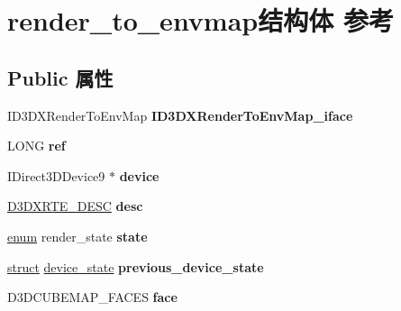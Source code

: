 \hypertarget{structrender__to__envmap}{}\section{render\+\_\+to\+\_\+envmap结构体 参考}
\label{structrender__to__envmap}
\subsection*{Public 属性}
\begin{DoxyCompactItemize}
\item 
\mbox{\label{structrender__to__envmap_adb946b3704111c374a41ec09aa863e51}} 
I\+D3\+D\+X\+Render\+To\+Env\+Map {\bfseries I\+D3\+D\+X\+Render\+To\+Env\+Map\+\_\+iface}
\item 
\mbox{\label{structrender__to__envmap_a16d9df6215a23ee7cfeef3804cf83f51}} 
L\+O\+NG {\bfseries ref}
\item 
\mbox{\label{structrender__to__envmap_a9f87ad2f8f277e0a9e319f4c0edafddf}} 
I\+Direct3\+D\+Device9 $\ast$ {\bfseries device}
\item 
\mbox{\label{structrender__to__envmap_aac93d6df41a5bb0b1b993d20ac7cc25e}} 
\hyperlink{struct___d3_d_x_r_t_e___d_e_s_c}{D3\+D\+X\+R\+T\+E\+\_\+\+D\+E\+SC} {\bfseries desc}
\item 
\mbox{\label{structrender__to__envmap_a7c32ff5096e3f8248fe1bcb3d2c52666}} 
\hyperlink{interfaceenum}{enum} render\+\_\+state {\bfseries state}
\item 
\mbox{\label{structrender__to__envmap_acb0bbeb56de93c3775a23d786f5df1fa}} 
\hyperlink{interfacestruct}{struct} \hyperlink{structdevice__state}{device\+\_\+state} {\bfseries previous\+\_\+device\+\_\+state}
\item 
\mbox{\label{structrender__to__envmap_a623b4c303a1f0105e2cf15a5fb884a61}} 
D3\+D\+C\+U\+B\+E\+M\+A\+P\+\_\+\+F\+A\+C\+ES {\bfseries face}
\item 
\mbox{\label{structrender__to__envmap_a6851f4e6454b1ff25d94271a61fe9392}} 

\end{DoxyCompactItemize}
